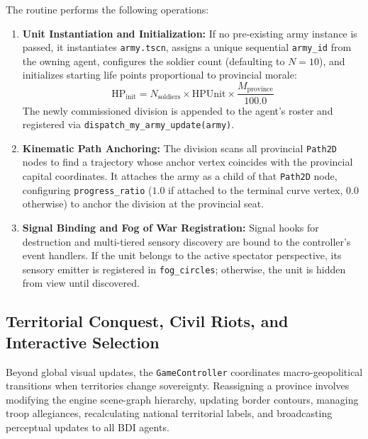 The routine performs the following operations:
\begin{enumerate}
    \item \textbf{Unit Instantiation and Initialization:} If no pre-existing army instance is passed, it instantiates \texttt{army.tscn}, assigns a unique sequential \texttt{army\_id} from the owning agent, configures the soldier count (defaulting to $N = 10$), and initializes starting life points proportional to provincial morale:
    \begin{equation}
        \text{HP}_{\text{init}} = N_{\text{soldiers}} \times \text{HPUnit} \times \frac{M_{\text{province}}}{100.0}
    \end{equation}
    The newly commissioned division is appended to the agent's roster and registered via \texttt{dispatch\_my\_army\_update(army)}.
    \item \textbf{Kinematic Path Anchoring:} The division scans all provincial \texttt{Path2D} nodes to find a trajectory whose anchor vertex coincides with the provincial capital coordinates. It attaches the army as a child of that \texttt{Path2D} node, configuring \texttt{progress\_ratio} ($1.0$ if attached to the terminal curve vertex, $0.0$ otherwise) to anchor the division at the provincial seat.
    \item \textbf{Signal Binding and Fog of War Registration:} Signal hooks for destruction and multi-tiered sensory discovery are bound to the controller's event handlers. If the unit belongs to the active spectator perspective, its sensory emitter is registered in \texttt{fog\_circles}; otherwise, the unit is hidden from view until discovered.
\end{enumerate}

\subsection{Territorial Conquest, Civil Riots, and Interactive Selection}
\label{subsec:territorial_conquest_selection}

Beyond global visual updates, the \texttt{GameController} coordinates macro-geopolitical transitions when territories change sovereignty. Reassigning a province involves modifying the engine scene-graph hierarchy, updating border contours, managing troop allegiances, recalculating national territorial labels, and broadcasting perceptual updates to all BDI agents.

